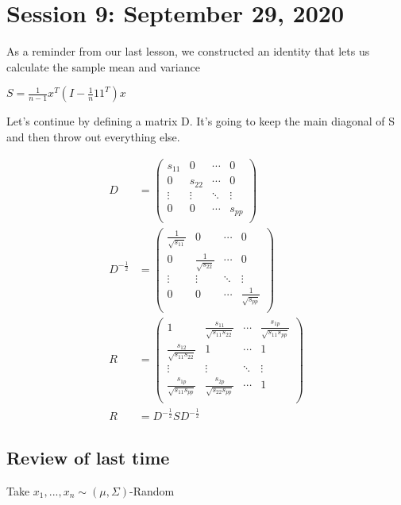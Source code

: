 \chapter{Session 9: September 29, 2020}
\label{ninth}
As a reminder from our last lesson, we constructed an identity that lets us calculate the sample mean and variance

$S = \frac{1}{n-1}x^T(I-\frac{1}{n}11^T)x$

Let's continue by defining a matrix D. It's going to keep the main diagonal of S and then throw out everything else.

\begin{align*}
    D &= \begin{pmatrix}
    s_{11} & 0 & \cdots & 0 \\
    0 & s_{22} & \cdots & 0 \\
    \vdots & \vdots & \ddots & \vdots \\
    0 & 0 & \cdots & s_{pp} \\
    \end{pmatrix}\\
    D^{-\frac{1}{2}} &= \begin{pmatrix}
    \frac{1}{\sqrt{s_{11}}} & 0 & \cdots & 0 \\
    0 & \frac{1}{\sqrt{s_{22}}} & \cdots & 0 \\
    \vdots & \vdots & \ddots & \vdots \\
    0 & 0 & \cdots & \frac{1}{\sqrt{s_{pp}}} \\
    \end{pmatrix}\\
    R &= \begin{pmatrix}
    1 & \frac{s_{11}}{\sqrt{s_{11}s_{22}}} & \cdots & \frac{s_{1p}}{\sqrt{s_{11}s_{pp}}} \\
    \frac{s_{12}}{\sqrt{s_{11}s_{22}}}& 1 & \cdots & 1\\
    \vdots & \vdots & \ddots & \vdots\\
    \frac{s_{1p}}{\sqrt{s_{11}s_{pp}}}& \frac{s_{2p}}{\sqrt{s_{22}s_{pp}}} & \cdots & 1\\
    \end{pmatrix}\\
    R &= D^{-\frac{1}{2}}SD^{-\frac{1}{2}}
\end{align*}

\section{Review of last time}
Take $x_1,...,x_n \sim (\mu,\Sigma)$-Random

